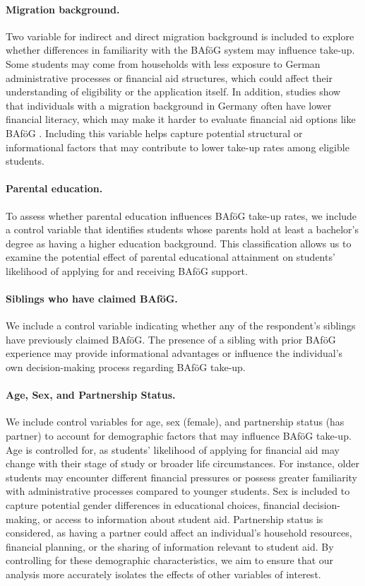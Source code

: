 \paragraph{Migration background.} Two variable for indirect and direct migration background is included to explore whether differences in familiarity with the BAföG system may influence take-up. 
Some students may come from households with less exposure to German administrative processes or financial aid structures, which could affect their understanding of eligibility or the application itself. 
In addition, studies show that individuals with a migration background in Germany often have lower financial literacy, which may make it harder to evaluate financial aid options like BAföG \citep{Tsegay_2024}. 
Including this variable helps capture potential structural or informational factors that may contribute to lower take-up rates among eligible students. 

\paragraph{Parental education.}
To assess whether parental education influences BAföG take-up rates, we include a control variable that identifies students whose parents hold at least a bachelor’s degree as having a higher education background. 
This classification allows us to examine the potential effect of parental educational attainment on students’ likelihood of applying for and receiving BAföG support.

\paragraph{Siblings who have claimed BAföG.}
We include a control variable indicating whether any of the respondent’s siblings have previously claimed BAföG. 
The presence of a sibling with prior BAföG experience may provide informational advantages or influence the individual’s own decision-making process regarding BAföG take-up.

\paragraph{Age, Sex, and Partnership Status.}
We include control variables for age, sex (female), and partnership status (has partner) to account for demographic factors that may influence BAföG take-up. 
Age is controlled for, as students’ likelihood of applying for financial aid may change with their stage of study or broader life circumstances. 
For instance, older students may encounter different financial pressures or possess greater familiarity with administrative processes compared to younger students.
Sex is included to capture potential gender differences in educational choices, financial decision-making, or access to information about student aid. 
Partnership status is considered, as having a partner could affect an individual’s household resources, financial planning, or the sharing of information relevant to student aid. 
By controlling for these demographic characteristics, we aim to ensure that our analysis more accurately isolates the effects of other variables of interest.



